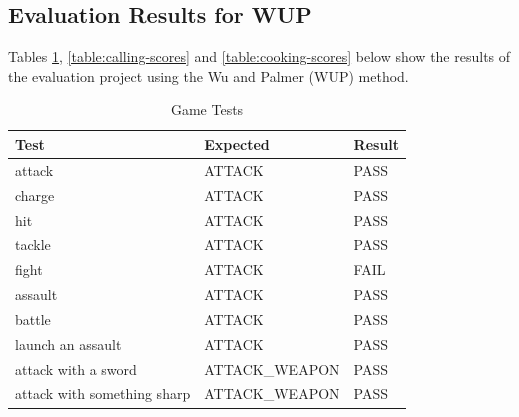\documentclass[11pt]{article}
\begin{document}
\begin{appendices}
\newpage
\subsection{Evaluation Results for WUP}
\label{appendix:evaluation-wup}

Tables \ref{table:game-scores}, \ref{table:calling-scores} and \ref{table:cooking-scores} below show the results of the evaluation project using the Wu and Palmer (WUP) method.

\begin{table}[H]
\centering
\caption{Game Tests}
\label{table:game-scores}
\begin{tabular}{lll}
\multicolumn{1}{l|}{Test}                           & \multicolumn{1}{l|}{Expected}           & Result                       \\ \hline
\multicolumn{1}{l|}{attack}                         & \multicolumn{1}{l|}{ATTACK}             & \cellcolor[HTML]{67FD9A}PASS \\ \hline
\multicolumn{1}{l|}{charge}                         & \multicolumn{1}{l|}{ATTACK}             & \cellcolor[HTML]{67FD9A}PASS \\ \hline
\multicolumn{1}{l|}{hit}                            & \multicolumn{1}{l|}{ATTACK}             & \cellcolor[HTML]{67FD9A}PASS \\ \hline
\multicolumn{1}{l|}{tackle}                         & \multicolumn{1}{l|}{ATTACK}             & \cellcolor[HTML]{67FD9A}PASS \\ \hline
\multicolumn{1}{l|}{fight}                          & \multicolumn{1}{l|}{ATTACK}             & \cellcolor[HTML]{FD6864}FAIL \\ \hline
\multicolumn{1}{l|}{assault}                        & \multicolumn{1}{l|}{ATTACK}             & \cellcolor[HTML]{67FD9A}PASS \\ \hline
\multicolumn{1}{l|}{battle}                         & \multicolumn{1}{l|}{ATTACK}             & \cellcolor[HTML]{67FD9A}PASS \\ \hline
\multicolumn{1}{l|}{launch an assault}              & \multicolumn{1}{l|}{ATTACK}             & \cellcolor[HTML]{67FD9A}PASS \\ \hline
\multicolumn{1}{l|}{attack with a sword}            & \multicolumn{1}{l|}{ATTACK\_WEAPON}     & \cellcolor[HTML]{67FD9A}PASS \\ \hline
\multicolumn{1}{l|}{attack with something sharp}    & \multicolumn{1}{l|}{ATTACK\_WEAPON}     & \cellcolor[HTML]{67FD9A}PASS \\ \hline

\end{tabular}
\end{table}
\end{appendices}
\end{document}
